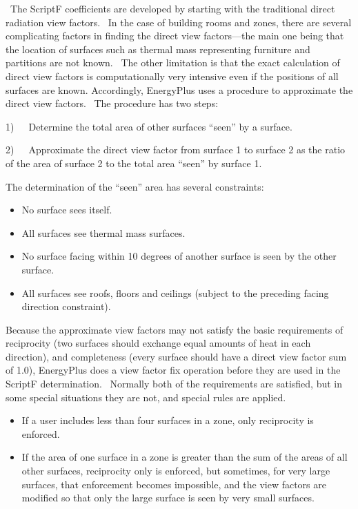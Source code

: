 ~The ScriptF coefficients are developed by starting with the traditional direct radiation view factors.~ In the case of building rooms and zones, there are several complicating factors in finding the direct view factors---the main one being that the location of surfaces such as thermal mass representing furniture and partitions are not known.~ The other limitation is that the exact calculation of direct view factors is computationally very intensive even if the positions of all surfaces are known. Accordingly, EnergyPlus uses a procedure to approximate the direct view factors.~ The procedure has two steps:

1)~~~Determine the total area of other surfaces ``seen'' by a surface.

2)~~~Approximate the direct view factor from surface 1 to surface 2 as the ratio of the area of surface 2 to the total area ``seen'' by surface 1.

The determination of the ``seen'' area has several constraints:

\begin{itemize}
\item
  No surface sees itself.
\item
  All surfaces see thermal mass surfaces.
\item
  No surface facing within 10 degrees of another surface is seen by the other surface.
\item
  All surfaces see roofs, floors and ceilings (subject to the preceding facing direction constraint).
\end{itemize}

Because the approximate view factors may not satisfy the basic requirements of reciprocity (two surfaces should exchange equal amounts of heat in each direction), and completeness (every surface should have a direct view factor sum of 1.0), EnergyPlus does a view factor fix operation before they are used in the ScriptF determination.~ Normally both of the requirements are satisfied, but in some special situations they are not, and special rules are applied.

\begin{itemize}
\item
  If a user includes less than four surfaces in a zone, only reciprocity is enforced.
\item
  If the area of one surface in a zone is greater than the sum of the areas of all other surfaces, reciprocity only is enforced, but sometimes, for very large surfaces, that enforcement becomes impossible, and the view factors are modified so that only the large surface is seen by very small surfaces.
\end{itemize}

